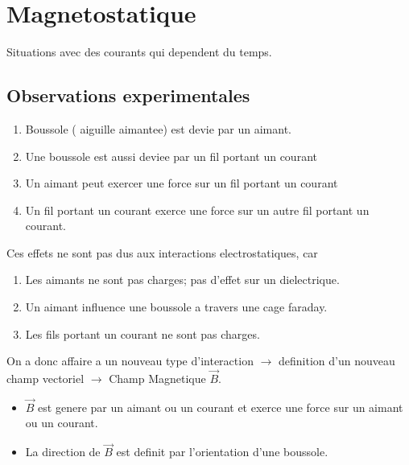 \documentclass[../main.tex]{subfiles}
\begin{document}
\section{Magnetostatique}
Situations avec des courants qui dependent du temps.
\subsection*{Observations experimentales}
\begin{enumerate}
	\item Boussole ( aiguille aimantee) est devie par un aimant.
	\item Une boussole est aussi deviee par un fil portant un courant
	\item Un aimant peut exercer une force sur un fil portant un courant
	\item Un fil portant un courant exerce une force sur un autre fil portant un courant.
\end{enumerate}
Ces effets ne sont pas dus aux interactions electrostatiques, car
\begin{enumerate}
\item Les aimants ne sont pas charges; pas d'effet sur un dielectrique.
\item Un aimant influence une boussole a travers une cage faraday.
\item Les fils portant un courant ne sont pas charges.
\end{enumerate}
On a donc affaire a un nouveau type d'interaction $\to $ definition d'un nouveau champ vectoriel $\to $ Champ Magnetique $\vec{B}$.\\
\begin{itemize}
\item $\vec{B}$ est genere par un aimant ou un courant et exerce une force sur un aimant ou un courant.
\item La direction de $\vec{B}$ est definit par l'orientation d'une boussole.
\end{itemize}
\end{document}

